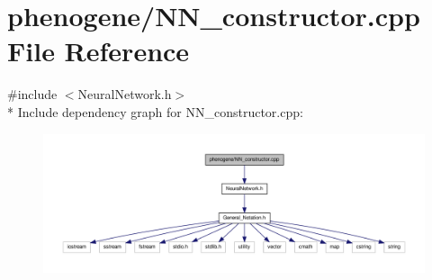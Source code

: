 \hypertarget{a00016}{\section{phenogene/\-N\-N\-\_\-constructor.cpp File Reference}
\label{d7/d7a/a00016}
}
{\ttfamily \#include $<$Neural\-Network.\-h$>$}\\*
Include dependency graph for N\-N\-\_\-constructor.\-cpp\-:
\nopagebreak
\begin{figure}[H]
\begin{center}
\leavevmode
\includegraphics[width=350pt]{d1/dc6/a00037}
\end{center}
\end{figure}
